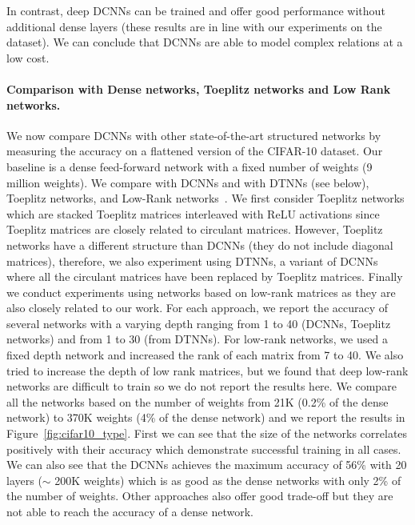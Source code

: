 In contrast, deep DCNNs can be trained and offer good performance without additional dense layers (these results are in line with our experiments on the \yt dataset).
We can conclude that DCNNs are able to model complex relations at a low cost. 



\paragraph{Comparison with Dense networks, Toeplitz networks and Low Rank networks.}
We now compare DCNNs with other state-of-the-art structured networks by measuring the accuracy on a flattened version of the CIFAR-10 dataset.
Our baseline is a dense feed-forward network with a fixed number of weights (9 million weights).
We compare with DCNNs and with DTNNs (see below), Toeplitz networks, and Low-Rank networks~\cite{8099498}.
We first consider Toeplitz networks which are stacked Toeplitz matrices interleaved with ReLU activations since Toeplitz matrices are closely related to circulant matrices.
However, Toeplitz networks have a different structure than DCNNs (they do not include diagonal matrices), therefore, we also experiment using DTNNs, a variant of DCNNs where all the circulant matrices have been replaced by Toeplitz matrices.
Finally we conduct experiments using networks based on low-rank matrices as they are also closely related to our work.
For each approach, we report the accuracy of several networks with a varying depth ranging from 1 to 40 (DCNNs, Toeplitz networks) and from 1 to 30 (from DTNNs).
For low-rank networks, we used a fixed depth network and increased the rank of each matrix from 7 to 40.
We also tried to increase the depth of low rank matrices, but we found that deep low-rank networks are difficult to train so we do not report the results here.
We compare all the networks based on the number of weights from 21K (0.2\% of the dense network) to 370K weights (4\% of the dense network) and we report the results in Figure~\ref{fig:cifar10_type}. 
First we can see that the size of the networks correlates positively with their accuracy which demonstrate successful training in all cases.
We can also see that the DCNNs achieves the maximum accuracy of 56\% with 20 layers ($\sim$ 200K weights) which is as good as the dense networks with only 2\% of the number of weights.
Other approaches also offer good trade-off but they are not able to reach the accuracy of a dense network.

